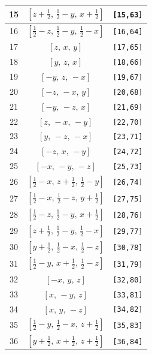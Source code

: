 \documentclass[fleqn,8pt]{jsarticle}
\begin{document}
\begin{longtable}{ccc}
15 & $\left[ z + \frac{1}{2},\, \frac{1}{2} - y,\, x + \frac{1}{2} \right]$ & {\tt [15,63]} \\ \hline
16 & $\left[ \frac{1}{2} - z,\, \frac{1}{2} - y,\, \frac{1}{2} - x \right]$ & {\tt [16,64]} \\ \hline
17 & $\left[ z,\, x,\, y \right]$ & {\tt [17,65]} \\ \hline
18 & $\left[ y,\, z,\, x \right]$ & {\tt [18,66]} \\ \hline
19 & $\left[ - y,\, z,\, - x \right]$ & {\tt [19,67]} \\ \hline
20 & $\left[ - z,\, - x,\, y \right]$ & {\tt [20,68]} \\ \hline
21 & $\left[ - y,\, - z,\, x \right]$ & {\tt [21,69]} \\ \hline
22 & $\left[ z,\, - x,\, - y \right]$ & {\tt [22,70]} \\ \hline
23 & $\left[ y,\, - z,\, - x \right]$ & {\tt [23,71]} \\ \hline
24 & $\left[ - z,\, x,\, - y \right]$ & {\tt [24,72]} \\ \hline
25 & $\left[ - x,\, - y,\, - z \right]$ & {\tt [25,73]} \\ \hline
26 & $\left[ \frac{1}{2} - x,\, z + \frac{1}{2},\, \frac{1}{2} - y \right]$ & {\tt [26,74]} \\ \hline
27 & $\left[ \frac{1}{2} - x,\, \frac{1}{2} - z,\, y + \frac{1}{2} \right]$ & {\tt [27,75]} \\ \hline
28 & $\left[ \frac{1}{2} - z,\, \frac{1}{2} - y,\, x + \frac{1}{2} \right]$ & {\tt [28,76]} \\ \hline
29 & $\left[ z + \frac{1}{2},\, \frac{1}{2} - y,\, \frac{1}{2} - x \right]$ & {\tt [29,77]} \\ \hline
30 & $\left[ y + \frac{1}{2},\, \frac{1}{2} - x,\, \frac{1}{2} - z \right]$ & {\tt [30,78]} \\ \hline
31 & $\left[ \frac{1}{2} - y,\, x + \frac{1}{2},\, \frac{1}{2} - z \right]$ & {\tt [31,79]} \\ \hline
32 & $\left[ - x,\, y,\, z \right]$ & {\tt [32,80]} \\ \hline
33 & $\left[ x,\, - y,\, z \right]$ & {\tt [33,81]} \\ \hline
34 & $\left[ x,\, y,\, - z \right]$ & {\tt [34,82]} \\ \hline
35 & $\left[ \frac{1}{2} - y,\, \frac{1}{2} - x,\, z + \frac{1}{2} \right]$ & {\tt [35,83]} \\ \hline
36 & $\left[ y + \frac{1}{2},\, x + \frac{1}{2},\, z + \frac{1}{2} \right]$ & {\tt [36,84]} \\ \hline

\end{longtable}
\end{document}
